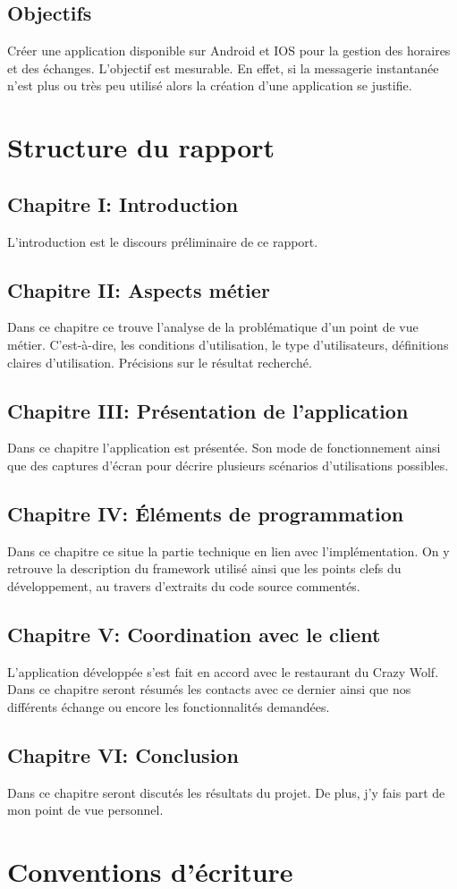 \subsection*{Objectifs}

Créer une application disponible sur Android et IOS pour la gestion des horaires et des échanges. L'objectif est mesurable. En effet, si la messagerie instantanée n'est plus ou très peu utilisé alors la création d'une application se justifie.


\section[Structure du rapport]{Structure du rapport}

\subsection*{Chapitre I: Introduction}
L'introduction est le discours préliminaire de ce rapport.

\subsection*{Chapitre II: Aspects métier}
Dans ce chapitre ce trouve l'analyse de la problématique d'un point de vue métier. C'est-à-dire, les conditions d'utilisation, le type d'utilisateurs, définitions claires d'utilisation. Précisions sur le résultat recherché.

\subsection*{Chapitre III: Présentation de l'application}
Dans ce chapitre l'application est présentée. Son mode de fonctionnement ainsi que des captures d'écran pour décrire plusieurs scénarios d'utilisations possibles.

\subsection*{Chapitre IV: Éléments de programmation}
Dans ce chapitre ce situe la partie technique en lien avec l'implémentation. On y retrouve la description du framework utilisé ainsi que les points clefs du développement, au travers d'extraits du code source commentés.

\subsection*{Chapitre V: Coordination avec le client}
L'application développée s'est fait en accord avec le restaurant du Crazy Wolf. Dans ce chapitre seront résumés les contacts avec ce dernier ainsi que nos différents échange ou encore les fonctionnalités demandées.

\subsection*{Chapitre VI: Conclusion}
Dans ce chapitre seront discutés les résultats du projet. De plus, j'y fais part de mon point de vue personnel.

\section[Table des symboles]{Conventions d'écriture}

